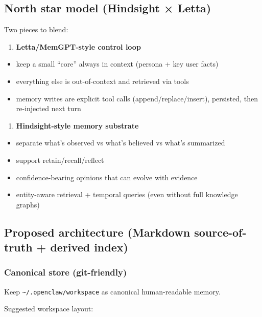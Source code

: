 \subsection{North star model (Hindsight × Letta)}


Two pieces to blend:

\begin{enumerate}
  \item \textbf{Letta/MemGPT-style control loop}
\end{enumerate}


\begin{itemize}
  \item keep a small “core” always in context (persona + key user facts)
  \item everything else is out-of-context and retrieved via tools
  \item memory writes are explicit tool calls (append/replace/insert), persisted, then re-injected next turn
\end{itemize}


\begin{enumerate}
  \item \textbf{Hindsight-style memory substrate}
\end{enumerate}


\begin{itemize}
  \item separate what’s observed vs what’s believed vs what’s summarized
  \item support retain/recall/reflect
  \item confidence-bearing opinions that can evolve with evidence
  \item entity-aware retrieval + temporal queries (even without full knowledge graphs)
\end{itemize}


\subsection{Proposed architecture (Markdown source-of-truth + derived index)}


\subsubsection{Canonical store (git-friendly)}


Keep \texttt{\textasciitilde{}/.openclaw/workspace} as canonical human-readable memory.

Suggested workspace layout:

